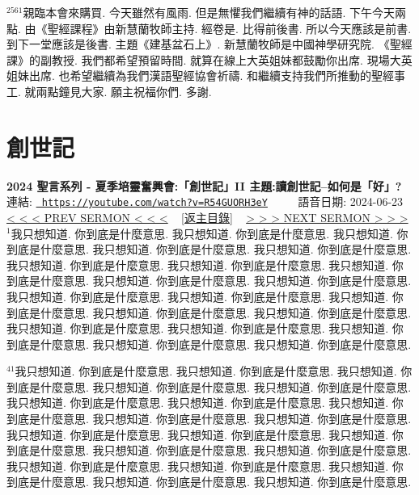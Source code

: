 \documentclass{book}
\begin{document}
$^{2561}$親臨本會來購買.
今天雖然有風雨.
但是無懼我們繼續有神的話語.
下午今天兩點.
由《聖經課程》由新慧蘭牧師主持.
經卷是.
比得前後書.
所以今天應該是前書.
到下一堂應該是後書.
主題《建基盆石上》.
新慧蘭牧師是中國神學研究院.
《聖經課》的副教授.
我們都希望預留時間.
就算在線上大英姐妹都鼓勵你出席.
現場大英姐妹出席.
也希望繼續為我們漢語聖經協會祈禱.
和繼續支持我們所推動的聖經事工.
就兩點鐘見大家.
願主祝福你們.
多謝.
\newpage



\section{創世記}
\label{sec:R54GUORH3eY}
\textbf{2024 聖言系列 - 夏季培靈奮興會:「創世記」II 主題:讀創世記–如何是「好」?}
\newline
\newline
連結: \href{https://youtube.com/watch?v=R54GUORH3eY}{\texttt{ https://youtube.com/watch?v=R54GUORH3eY}} ~~~~ 語音日期: 2024-06-23 
\newline
\newline
\hyperref[sec:EZL_OCl_lJE]{\small{< < < PREV SERMON < < <}}
~
\hyperref[sec:index]{\small{[返主目錄]}}
~
\hyperref[sec:iBfE9eVripQ]{\small{> > > NEXT SERMON > > >}}
\newline
\newline
$^{1}$我只想知道.
你到底是什麼意思.
我只想知道.
你到底是什麼意思.
我只想知道.
你到底是什麼意思.
我只想知道.
你到底是什麼意思.
我只想知道.
你到底是什麼意思.
我只想知道.
你到底是什麼意思.
我只想知道.
你到底是什麼意思.
我只想知道.
你到底是什麼意思.
我只想知道.
你到底是什麼意思.
我只想知道.
你到底是什麼意思.
我只想知道.
你到底是什麼意思.
我只想知道.
你到底是什麼意思.
我只想知道.
你到底是什麼意思.
我只想知道.
你到底是什麼意思.
我只想知道.
你到底是什麼意思.
我只想知道.
你到底是什麼意思.
我只想知道.
你到底是什麼意思.
我只想知道.
你到底是什麼意思.
我只想知道.
你到底是什麼意思.
我只想知道.
你到底是什麼意思.

$^{41}$我只想知道.
你到底是什麼意思.
我只想知道.
你到底是什麼意思.
我只想知道.
你到底是什麼意思.
我只想知道.
你到底是什麼意思.
我只想知道.
你到底是什麼意思.
我只想知道.
你到底是什麼意思.
我只想知道.
你到底是什麼意思.
我只想知道.
你到底是什麼意思.
我只想知道.
你到底是什麼意思.
我只想知道.
你到底是什麼意思.
我只想知道.
你到底是什麼意思.
我只想知道.
你到底是什麼意思.
我只想知道.
你到底是什麼意思.
我只想知道.
你到底是什麼意思.
我只想知道.
你到底是什麼意思.
我只想知道.
你到底是什麼意思.
我只想知道.
你到底是什麼意思.
我只想知道.
你到底是什麼意思.
我只想知道.
你到底是什麼意思.
我只想知道.
你到底是什麼意思.
\end{document}
